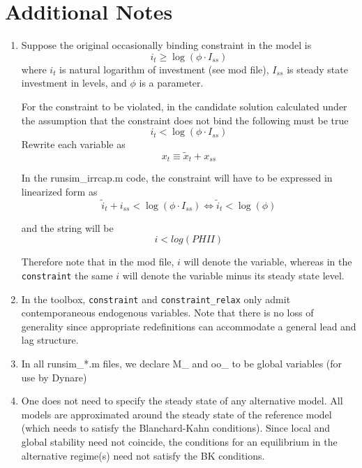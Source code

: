 \documentclass[12pt]{article}
\begin{document}
\section{Additional Notes}

\begin{enumerate}
\item Suppose the original occasionally binding constraint in the model is 
\begin{equation*}
i_{t}\geq \log \left( \phi \cdot I_{ss}\right)
\end{equation*}%
where $i_{t}$ is natural logarithm of investment (see mod file), $I_{ss}$ is
steady state investment in levels, and $\phi $ is a parameter.

For the constraint to be violated, in the candidate solution calculated
under the assumption that the constraint does not bind the following must be
true%
\begin{equation*}
i_{t}<\log \left( \phi \cdot I_{ss}\right)
\end{equation*}%
Rewrite each variable as%
\begin{equation*}
x_{t}\equiv \widetilde{x}_{t}+x_{ss}
\end{equation*}

In the runsim\_irrcap.m code, the constraint will have to be expressed in
linearized form as%
\begin{equation*}
\widetilde{i}_{t}+i_{ss}<\log \left( \phi \cdot I_{ss}\right)
\Longleftrightarrow \widetilde{i}_{t}<\log \left( \phi \right)
\end{equation*}

and the string will be 
\begin{equation*}
i<log(PHII)
\end{equation*}

Therefore note that in the mod file, $i$ will denote the variable, whereas
in the \texttt{constraint} the same $i$ will denote the variable minus its
steady state level.

\item In the toolbox, \texttt{constraint} and \texttt{constraint\_relax}
only admit contemporaneous endogenous variables. Note that there is no loss
of generality since appropriate redefinitions can accommodate a general lead
and lag structure.

\item In all runsim\_*.m files, we declare M\_ and oo\_ to be global
variables (for use by Dynare)

\item One does not need to specify the steady state of any alternative
model. All models are approximated around the steady state of the reference
model (which needs to satisfy the Blanchard-Kahn conditions). Since local
and global stability need not coincide, the conditions for an equilibrium in
the alternative regime(s) need not satisfy the BK conditions.


\end{enumerate}
\end{document}
